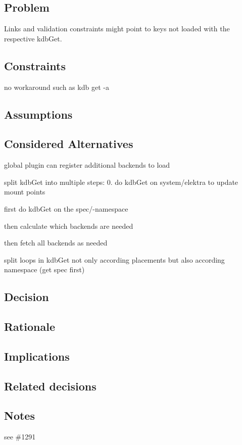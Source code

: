 \subsection*{Problem}

Links and validation constraints might point to keys not loaded with the respective {\ttfamily kdb\+Get}.

\subsection*{Constraints}


\begin{DoxyItemize}
\item no workaround such as {\ttfamily kdb get -\/a}
\end{DoxyItemize}

\subsection*{Assumptions}

\subsection*{Considered Alternatives}


\begin{DoxyItemize}
\item global plugin can register additional backends to load
\item split {\ttfamily kdb\+Get} into multiple steps\+: 0. do {\ttfamily kdb\+Get} on {\ttfamily system/elektra} to update mount points
\begin{DoxyEnumerate}
\item first do {\ttfamily kdb\+Get} on the {\ttfamily spec/}-\/namespace
\item then calculate which backends are needed
\item then fetch all backends as needed
\end{DoxyEnumerate}
\item split loops in {\ttfamily kdb\+Get} not only according placements but also according namespace (get spec first)
\end{DoxyItemize}

\subsection*{Decision}

\subsection*{Rationale}

\subsection*{Implications}

\subsection*{Related decisions}

\subsection*{Notes}

see \#1291 